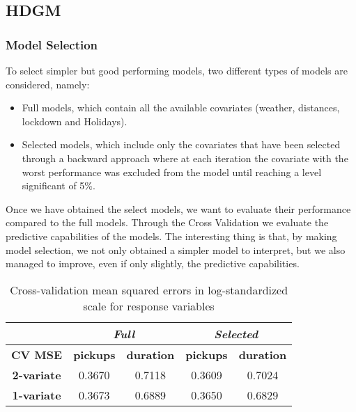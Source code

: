 \subsection{HDGM}
\subsubsection{Model Selection} To select simpler but good performing models, two different types of models are considered, namely:
\begin{itemize}
	\item Full models, which contain all the available covariates (weather, distances, lockdown and Holidays).
	\item Selected models, which include only the covariates that have been selected through a backward approach where at each iteration the covariate with the worst performance was excluded from the model until reaching a level significant of \num{5}\%.
\end{itemize}
Once we have obtained the select models, we want to evaluate their performance compared to the full models. Through the Cross Validation we evaluate the predictive capabilities of the models. The interesting thing is that, by making model selection, we not only obtained a simpler model to interpret, but we also managed to improve, even if only slightly, the predictive capabilities. 
\begin{table}[h!]
	\centering
	\begin{tabular}{c|cc|cc}
		\hline
		\multicolumn{1}{l|}{} & \multicolumn{2}{c|}{\textit{Full}} & \multicolumn{2}{c}{\textit{Selected} }\\ 
		\hline
		\textbf{CV MSE} & \multicolumn{1}{c|}{\textbf{pickups }} & \textbf{duration} & \multicolumn{1}{c|}{\textbf{pickups}} & \textbf{duration} \\ 
		\hline
		\textbf{2-variate } & \multicolumn{1}{c|}{0.3670}  & 0.7118   & \multicolumn{1}{c|}{0.3609}  & 0.7024   \\ 
		\hline
		\textbf{1-variate } & \multicolumn{1}{c|}{0.3673}  & 0.6889   & \multicolumn{1}{c|}{0.3650}  & 0.6829   \\ 
		\hline
	\end{tabular}
	\caption{Cross-validation mean squared errors in log-standardized scale for response variables}
	\label{Cross-validation mean squared errors HDGM}
\end{table}

